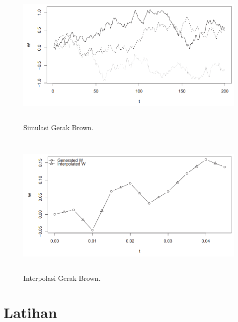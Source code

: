 \documentclass[a4paper,12pt]{article}
\theoremstyle{definition}
\begin{document}
\begin{figure}[b]
    \centering
    \includegraphics[height=7cm]{gb/K1G3.png}
    \caption{Simulasi Gerak Brown.}
    \label{K1G3}
\end{figure}

\begin{figure}
    \centering
    \includegraphics[height=7cm]{gb/K1G4.png}
    \caption{Interpolasi Gerak Brown.}
    \label{K1G4}
\end{figure}



\section{Latihan}





\newpage
\printbibliography[heading=bibintoc,title={Daftar Pustaka}]
\end{document}
